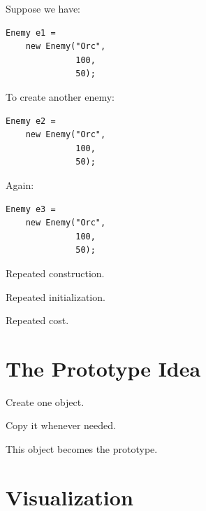 \documentclass[11pt,a4paper]{book}
\begin{document}
Suppose we have:

\begin{verbatim}
Enemy e1 =
    new Enemy("Orc",
              100,
              50);
\end{verbatim}

To create another enemy:

\begin{verbatim}
Enemy e2 =
    new Enemy("Orc",
              100,
              50);
\end{verbatim}

Again:

\begin{verbatim}
Enemy e3 =
    new Enemy("Orc",
              100,
              50);
\end{verbatim}

Repeated construction.

Repeated initialization.

Repeated cost.


\section{The Prototype Idea}

\begin{idea}

Create one object.

Copy it whenever needed.

\end{idea}

This object becomes the prototype.


\section{Visualization}
\end{document}
